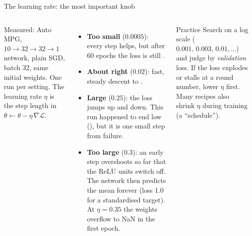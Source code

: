 \documentclass[aspectratio=169,10pt]{beamer}
\begin{document}
\begin{frame}{The learning rate: the most important knob}
\begin{columns}[T,onlytextwidth]
\centering
{}

\vspace{-0.5mm}
{\scriptsize\color{cTok}Measured: Auto MPG, $10\to32\to32\to1$ network, plain SGD, batch 32, same initial weights.
One run per setting.}
\small
The learning rate $\eta$ is the step length in $\theta\leftarrow\theta-\eta\,\nabla\mathcal L$.
\begin{itemize}
  \item \textbf{Too small} ($0.0005$): every step helps, but after 60 epochs the loss is still
        \lrSmallFinal.
  \item \textbf{About right} ($0.02$): fast, steady descent to \lrGoodFinal.
  \item \textbf{Large} ($0.25$): the loss jumps up and down. This run happened to end low
        (\lrNoisyFinal), but it is one small step from failure.
  \item \textbf{Too large} ($0.3$): an early step overshoots so far that the ReLU units switch
        off. The network then predicts the mean forever (loss 1.0 for a standardised target).
        At $\eta=0.35$ the weights overflow to NaN in the first epoch.
\end{itemize}
\begin{block}{Practice}
\footnotesize
Search on a log scale ($0.001,\,0.003,\,0.01,\dots$) and judge by \emph{validation} loss.
If the loss explodes or stalls at a round number, lower $\eta$ first. Many recipes also
shrink $\eta$ during training (a ``schedule'').
\end{block}
\end{columns}
\end{frame}
\end{document}
